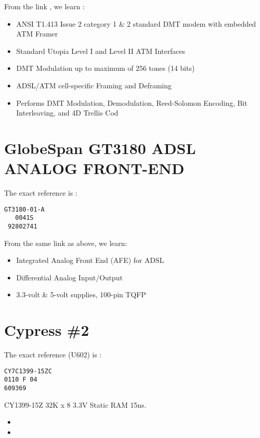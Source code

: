 \documentclass[a4paper,12pt]{article}
\begin{document}
From the link , we learn :
\begin{itemize}
\item ANSI T1.413 Issue 2 category 1 \& 2 standard DMT modem with
embedded ATM Framer
\item Standard Utopia Level I and Level II ATM Interfaces
\item DMT Modulation up to maximum of 256 tones (14 bits)
\item ADSL/ATM cell-specific Framing and Deframing
\item Performs DMT Modulation, Demodulation, Reed-Solomon Encoding,
Bit Interleaving, and 4D Trellis Cod
\end{itemize}



\section{GlobeSpan GT3180 ADSL ANALOG FRONT-END}

The exact reference is :
\begin{verbatim}
GT3180-01-A
   0041S
 92802741
\end{verbatim}

From the same link as above, we learn:
\begin{itemize}
\item Integrated Analog Front End (AFE) for ADSL
\item Differential Analog Input/Output
\item 3.3-volt \& 5-volt supplies, 100-pin TQFP
\end{itemize}

\section{Cypress \#2}

The exact reference (U602) is :
\begin{verbatim}
CY7C1399-15ZC
0110 F 04
609369
\end{verbatim}

CY1399-15Z 32K x 8 3.3V Static RAM 15ns.
\begin{itemize}

\item
{}
\item
{}
\end{itemize}
\end{document}
